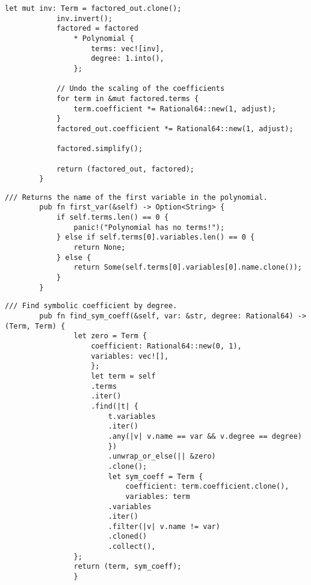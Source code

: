 {\begin{lstlisting}[caption={The implementation of the \texttt{factor()} method for the \texttt{Polynomial} struct}, label={lst:polynomial-factor}]
            let mut inv: Term = factored_out.clone();
            inv.invert();
            factored = factored
                * Polynomial {
                    terms: vec![inv],
                    degree: 1.into(),
                };

            // Undo the scaling of the coefficients
            for term in &mut factored.terms {
                term.coefficient *= Rational64::new(1, adjust);
            }
            factored_out.coefficient *= Rational64::new(1, adjust);

            factored.simplify();

            return (factored_out, factored);
        }
    \end{lstlisting}

    \begin{lstlisting}[caption={The implementation of the \texttt{first\_var()} method for the \texttt{Polynomial} struct}, label={lst:polynomial-first-var}]
        /// Returns the name of the first variable in the polynomial.
        pub fn first_var(&self) -> Option<String> {
            if self.terms.len() == 0 {
                panic!("Polynomial has no terms!");
            } else if self.terms[0].variables.len() == 0 {
                return None;
            } else {
                return Some(self.terms[0].variables[0].name.clone());
            }
        }
    \end{lstlisting}

    \begin{lstlisting}[caption={The implementation of the \texttt{find\_sym\_coeff()} method for the \texttt{Polynomial} struct}, label={lst:polynomial-find-sym-coeff}]
        /// Find symbolic coefficient by degree.
        pub fn find_sym_coeff(&self, var: &str, degree: Rational64) -> (Term, Term) {
                let zero = Term {
                    coefficient: Rational64::new(0, 1),
                    variables: vec![],
                    };
                    let term = self
                    .terms
                    .iter()
                    .find(|t| {
                        t.variables
                        .iter()
                        .any(|v| v.name == var && v.degree == degree)
                        })
                        .unwrap_or_else(|| &zero)
                        .clone();
                        let sym_coeff = Term {
                            coefficient: term.coefficient.clone(),
                            variables: term
                        .variables
                        .iter()
                        .filter(|v| v.name != var)
                        .cloned()
                        .collect(),
                };
                return (term, sym_coeff);
                }
    \end{lstlisting}

}
